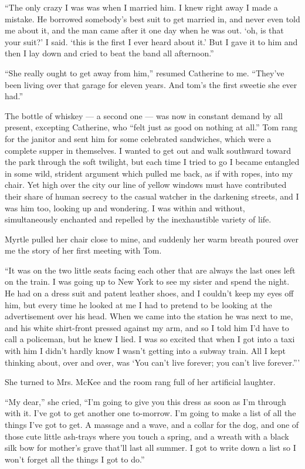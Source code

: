 \documentclass{znotebook}
\begin{document}
``The only crazy I was was when I married him. I knew right away I made a mistake. He borrowed somebody's best suit to get married in, and never even told me about it, and the man came after it one day when he was out. ‘oh, is that your suit?' I said. ‘this is the first I ever heard about it.' But I gave it to him and then I lay down and cried to beat the band all afternoon.''

``She really ought to get away from him,'' resumed Catherine to me. ``They've been living over that garage for eleven years. And tom's the first sweetie she ever had.''

The bottle of whiskey ---{} a second one ---{} was now in constant demand by all present, excepting Catherine, who ``felt just as good on nothing at all.'' Tom rang for the janitor and sent him for some celebrated sandwiches, which were a complete supper in themselves. I wanted to get out and walk southward toward the park through the soft twilight, but each time I tried to go I became entangled in some wild, strident argument which pulled me back, as if with ropes, into my chair. Yet high over the city our line of yellow windows must have contributed their share of human secrecy to the casual watcher in the darkening streets, and I was him too, looking up and wondering. I was within and without, simultaneously enchanted and repelled by the inexhaustible variety of life.

Myrtle pulled her chair close to mine, and suddenly her warm breath poured over me the story of her first meeting with Tom.

``It was on the two little seats facing each other that are always the last ones left on the train. I was going up to New York to see my sister and spend the night. He had on a dress suit and patent leather shoes, and I couldn't keep my eyes off him, but every time he looked at me I had to pretend to be looking at the advertisement over his head. When we came into the station he was next to me, and his white shirt-front pressed against my arm, and so I told him I'd have to call a policeman, but he knew I lied. I was so excited that when I got into a taxi with him I didn't hardly know I wasn't getting into a subway train. All I kept thinking about, over and over, was ‘You can't live forever; you can't live forever.'''

She turned to Mrs. McKee and the room rang full of her artificial laughter.

``My dear,'' she cried, ``I'm going to give you this dress as soon as I'm through with it. I've got to get another one to-morrow. I'm going to make a list of all the things I've got to get. A massage and a wave, and a collar for the dog, and one of those cute little ash-trays where you touch a spring, and a wreath with a black silk bow for mother's grave that'll last all summer. I got to write down a list so I won't forget all the things I got to do.''
\end{document}
